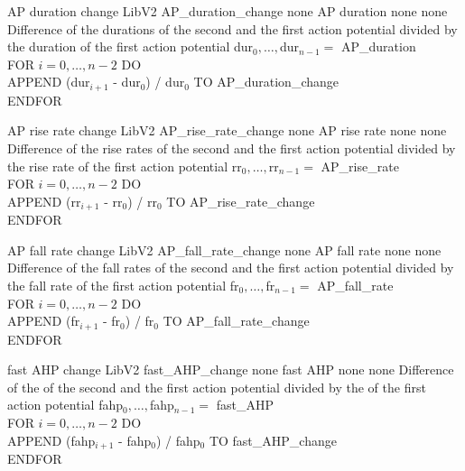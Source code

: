 \begin{efeature}
  {AP duration change}
  {LibV2}
  {AP\_duration\_change}
  {none}
  {AP duration}
  {none}
  {none}
  {Difference of the durations of the second and the first action potential divided by the duration of the first action potential}
  {
  dur$_0, \ldots, $dur$_{n-1} =$ AP\_duration \\
  FOR $i = 0, \dots, n - 2$ DO \+ \\
    APPEND (dur$_{i+1}$ - dur$_0$) / dur$_0$ TO AP\_duration\_change \- \\
  ENDFOR
  }
  
\end{efeature}

\begin{efeature}
  {AP rise rate change}
  {LibV2}
  {AP\_rise\_rate\_change}
  {none}
  {AP rise rate}
  {none}
  {none}
  {Difference of the rise rates of the second and the first action potential divided by the rise rate of the first action potential}
  {
  rr$_0, \ldots, $rr$_{n-1} =$ AP\_rise\_rate \\
  FOR $i = 0, \dots, n - 2$ DO \+ \\
    APPEND (rr$_{i+1}$ - rr$_0$) / rr$_0$ TO AP\_rise\_rate\_change \- \\
  ENDFOR
  }
  
\end{efeature}

\begin{efeature}
  {AP fall rate change}
  {LibV2}
  {AP\_fall\_rate\_change}
  {none}
  {AP fall rate}
  {none}
  {none}
  {Difference of the fall rates of the second and the first action potential divided by the fall rate of the first action potential}
  {
  fr$_0, \ldots, $fr$_{n-1} =$ AP\_fall\_rate \\
  FOR $i = 0, \dots, n - 2$ DO \+ \\
    APPEND (fr$_{i+1}$ - fr$_0$) / fr$_0$ TO AP\_fall\_rate\_change \- \\
  ENDFOR
  }
  
\end{efeature}

\begin{efeature}
  {fast AHP change}
  {LibV2}
  {fast\_AHP\_change}
  {none}
  {fast AHP}
  {none}
  {none}
  {Difference of the  of the second and the first action potential divided by the  of the first action potential}
  {
  fahp$_0, \ldots, $fahp$_{n-1} =$ fast\_AHP \\
  FOR $i = 0, \dots, n - 2$ DO \+ \\
    APPEND (fahp$_{i+1}$ - fahp$_0$) / fahp$_0$ TO fast\_AHP\_change \- \\
  ENDFOR
  }
  
\end{efeature}

